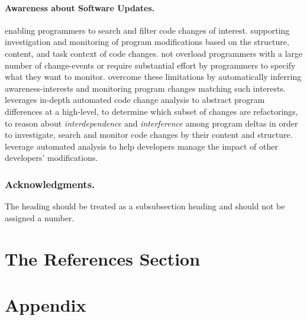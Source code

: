 \documentclass[runningheads,a4paper]{llncs}
\begin{document}
\paragraph{Awareness about Software Updates.} 
enabling programmers to search and filter code changes of interest. 
supporting investigation and monitoring of program modifications based on the structure, content, and task context of code changes.
not overload programmers with a large number of change-events or require substantial effort by programmers to specify what they want to monitor. 
overcome these limitations by automatically inferring awareness-interests and monitoring program changes matching such interests. 
leverages in-depth automated code change analysis to abstract program differences at a high-level, to determine which subset of changes are refactorings, to reason about {\em interdependence} and {\em interference} among program deltas in order to investigate, search and monitor code changes by their content and structure.  
leverage automated analysis to help developers manage the impact of other developers' modifications. 




\subsubsection*{Acknowledgments.} The heading should be treated as a
subsubsection heading and should not be assigned a number.

\section{The References Section}\label{references}



\section*{Appendix} 
\end{document}
